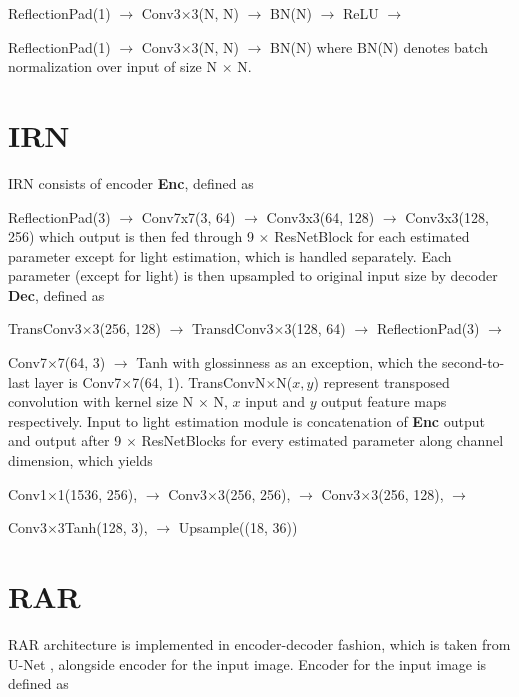 ReflectionPad(1) $\to$ Conv3$\times$3(N, N) $\to$ BN(N) $\to$
ReLU $\to$

ReflectionPad(1) $\to$ Conv3$\times$3(N, N) $\to$ BN(N)
\newline
\newline
where BN(N) denotes batch normalization over input of size N $\times$ N.
\section{IRN}
\label{sec:irn-architecture}
IRN consists of encoder \textbf{Enc}, defined as 
\newline

ReflectionPad(3) $\to$ Conv7x7(3, 64) $\to$ Conv3x3(64, 128) $\to$ Conv3x3(128, 256)
\newline
\newline
which output is then fed through 9 $\times$ ResNetBlock for each estimated parameter except for light estimation, which is handled separately. Each parameter (except for light) is then upsampled to original input size by decoder \textbf{Dec}, defined as
\newline
 
TransConv3$\times$3(256, 128) $\to$ TransdConv3$\times$3(128, 64) $\to$ ReflectionPad(3) $\to$

Conv7$\times$7(64, 3) $\to$ Tanh
\newline
\newline
with glossinness as an exception, which the second-to-last layer is  Conv7$\times$7(64, 1). TransConvN$\times$N($x, y$) represent transposed convolution with kernel size N $\times$ N, $x$ input and $y$ output feature maps respectively.
\newline
Input to light estimation module is concatenation of \textbf{Enc} output and output after 9 $\times$ ResNetBlocks for every estimated parameter along channel dimension, which yields
\newline

Conv1$\times$1(1536, 256), $\to$ Conv3$\times$3(256, 256), $\to$ Conv3$\times$3(256, 128), $\to$

Conv3$\times$3Tanh(128, 3), $\to$ Upsample((18, 36))

\section{RAR}
\label{sec:rar-architecture}
RAR architecture is implemented in encoder-decoder fashion, which is taken from U-Net \cite{u-net}, alongside encoder for the input image.
Encoder for the input image is defined as
\newline

